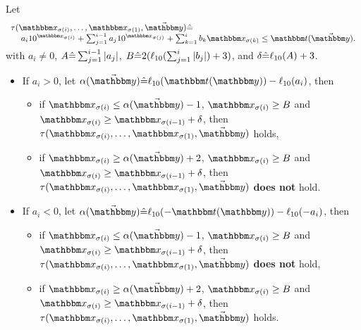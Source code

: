\vspace{-1mm}
\begin{lemma} \label{lem:exp-ineq}
Let  
%
$$
\small
\begin{array}{l}
\tau(\ivarx_{\sigma(i)}, \ldots, \ivarx_{\sigma(1)}, \vec{\ivary}) \Def  \\
\hspace{4mm} 
\vspace{-1mm}
a_i 10^{\ivarx_{\sigma(i)}}+\sum_{j=1}^{i-1} a_j 10^{\ivarx_{\sigma(j)}} + \sum_{k=1}^{i}b_k \ivarx_{\sigma(k)} \le \iterm(\vec{\ivary}).
\end{array}
$$
%
with $a_i \neq 0$, $A\hat{=} \sum_{j=1}^{i-1}|a_j|$, 
$B \hat{=} 2(\ell_{10}(\sum_{j=1}^{i}|b_j|)+3)$,
and $\delta\hat{=}  \ell_{10}(A)+3$. 
\begin{itemize}
    \item If $a_i > 0$, let $\alpha(\vec{\ivary}) \Def \ell_{10}(\iterm(\ivary))- \ell_{10}(a_i)$, then 
    \begin{itemize}
        \item if $\ivarx_{\sigma(i)} \le \alpha(\vec{\ivary})  -1$, $\ivarx_{\sigma(i)} \ge B$ and $\ivarx_{\sigma(i)} \ge \ivarx_{\sigma(i-1)} +\delta $, then $\tau(\ivarx_{\sigma(i)}, \ldots, \ivarx_{\sigma(1)}, \vec{\ivary})$ holds,
        \item if $\ivarx_{\sigma(i)} \ge \alpha(\vec{\ivary})  +2$, $\ivarx_{\sigma(i)} \ge B$ and $\ivarx_{\sigma(i)}  \ge \ivarx_{\sigma(i-1)} +\delta$, then $\tau(\ivarx_{\sigma(i)}, \ldots, \ivarx_{\sigma(1)}, \vec{\ivary})$ \textbf{does not} hold.
    \end{itemize}
    \item If $a_i < 0$, let $\alpha(\vec{\ivary})  \Def \ell_{10}(-\iterm(\ivary))- \ell_{10}(-a_i)$, then 
    \begin{itemize}
        \item if $\ivarx_{\sigma(i)} \le \alpha(\vec{\ivary})  -1$, $\ivarx_{\sigma(i)} \ge B$ and $\ivarx_{\sigma(i)} \ge \ivarx_{\sigma(i-1)} +\delta $, then $\tau(\ivarx_{\sigma(i)}, \ldots, \ivarx_{\sigma(1)}, \vec{\ivary})$ \textbf{does not} hold,
        \item if $\ivarx_{\sigma(i)} \ge \alpha(\vec{\ivary})  +2$, $\ivarx_{\sigma(i)} \ge B$ and $\ivarx_{\sigma(i)} \ge \ivarx_{\sigma(i-1)} +\delta $, then $\tau(\ivarx_{\sigma(i)}, \ldots, \ivarx_{\sigma(1)}, \vec{\ivary})$ holds.
    \end{itemize}
\end{itemize}
\end{lemma}

